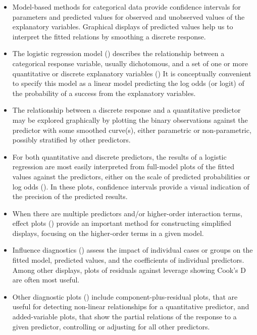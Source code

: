 \begin{itemize}
\item Model-based methods for categorical data provide confidence intervals
for parameters and predicted values for observed and unobserved values
of the explanatory variables.  Graphical displays of predicted values
help us to interpret the fitted relations by smoothing a discrete response.

\item The logistic regression model ()
describes the relationship between
a categorical response variable, usually dichotomous,
and a set of one or more quantitative or discrete explanatory variables
()
It is conceptually
convenient to specify this model as a linear model predicting
the log odds (or logit) of the probability of a success
from the explanatory variables.

\item The relationship between a discrete response and a quantitative predictor
may be explored graphically by plotting the binary observations
against the predictor with some smoothed curve(s), either parametric
or non-parametric, possibly stratified by
other predictors.


\item For both quantitative and discrete predictors, the results of
a logistic regression are most easily interpreted from full-model plots of
the fitted values against the predictors,
either on the scale of predicted probabilities or log odds
().
In these plots, confidence intervals provide a visual indication
of the precision of the predicted results.

\item When there are multiple predictors and/or higher-order
interaction terms,
effect plots ()
provide an important
method for constructing simplified displays, focusing on the
higher-order terms in a given model.

\item Influence diagnostics ()
assess the impact of individual cases or
groups on the fitted model, predicted values, and the coefficients of individual predictors.
Among other displays, plots of residuals against leverage showing Cook's D are
often most useful.

\item Other diagnostic plots ()
include component-plus-residual plots,
that are useful for detecting non-linear relationships for a quantitative predictor,
and added-variable plots, that show the partial relations of the response to a
given predictor, controlling or adjusting for all other predictors.


\end{itemize}
